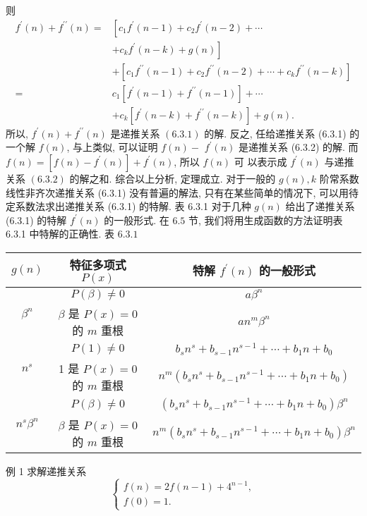 \documentclass{report}
\begin{document}
	则
	$$
	\begin{aligned}
	f^{\prime}(n)+f^{\prime \prime}(n)=& {\left[c_1 f^{\prime}(n-1)+c_2 f^{\prime}(n-2)+\cdots\right.} \\
	&\left.+c_k f^{\prime}(n-k)+g(n)\right] \\
	&+\left[c_1 f^{\prime \prime}(n-1)+c_2 f^{\prime \prime}(n-2)+\cdots+c_k f^{\prime \prime}(n-k)\right] \\
	=& c_1\left[f^{\prime}(n-1)+f^{\prime \prime}(n-1)\right]+\cdots \\
	&+c_k\left[f^{\prime}(n-k)+f^{\prime \prime}(n-k)\right]+g(n) .
	\end{aligned}
	$$
	所以, $f^{\prime}(n)+f^{\prime \prime}(n)$ 是递推关系 $(6.3 .1)$ 的解.
	反之, 任给递推关系 (6.3.1) 的一个解 $f(n)$, 与上类似, 可以证明 $f(n)-$ $f^{\prime}(n)$ 是递推关系 (6.3.2) 的解. 而 $f(n)=\left[f(n)-f^{\prime}(n)\right]+f^{\prime}(n)$, 所以 $f(n)$ 可 以表示成 $f^{\prime}(n)$ 与递推关系 $(6.3 .2)$ 的解之和.
	综合以上分析, 定理成立.
	对于一般的 $g(n), k$ 阶常系数线性非齐次递推关系 (6.3.1) 没有普遍的解法, 只有在某些简单的情况下, 可以用待定系数法求出递推关系 (6.3.1) 的特解. 表 6.3.1 对于几种 $g(n)$ 给出了递推关系 (6.3.1) 的特解 $f^{\prime}(n)$ 的一般形式. 在 $6.5$ 节, 我们将用生成函数的方法证明表 6.3.1 中特解的正确性.
	表 $6.3 .1$
	\begin{tabular}{c|c|c}
		\hline$g(n)$ & 特征多项式 $P(x)$ & 特解 $f^{\prime}(n)$ 的一般形式 \\
		\hline \multirow{2}{*}{$\beta^n$} & $P(\beta) \neq 0$ & $a \beta^n$ \\
		\cline { 2 - 3 } & $\beta$ 是 $P(x)=0$ 的 $m$ 重根 & $a n^m \beta^n$ \\
		\hline \multirow{2}{*}{$n^s$} & $P(1) \neq 0$ & $b_s n^s+b_{s-1} n^{s-1}+\cdots+b_1 n+b_0$ \\
		\cline { 2 - 3 } & 1 是 $P(x)=0$ 的 $m$ 重根 & $n^m\left(b_s n^s+b_{s-1} n^{s-1}+\cdots+b_1 n+b_0\right)$ \\
		\hline \multirow{2}{*}{$n^s \beta^n$} & $P(\beta) \neq 0$ & $\left(b_s n^s+b_{s-1} n^{s-1}+\cdots+b_1 n+b_0\right) \beta^n$ \\
		\cline { 2 - 3 } & $\beta$ 是 $P(x)=0$ 的 $m$ 重根 & $n^m\left(b_s n^s+b_{s-1} n^{s-1}+\cdots+b_1 n+b_0\right) \beta^n$ \\
		\hline
	\end{tabular}
例 1 求解递推关系
$$
\left\{\begin{array}{l}
f(n)=2 f(n-1)+4^{n-1}, \\
f(0)=1 .
\end{array}\right.
$$
\end{document}
